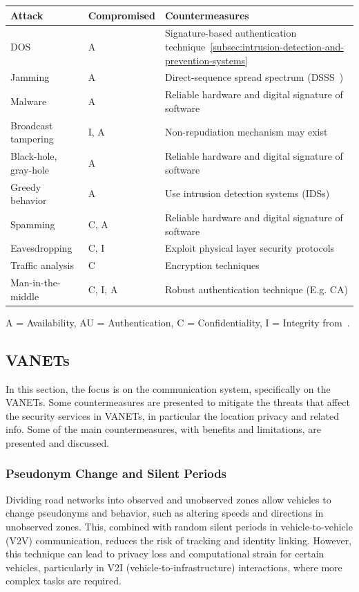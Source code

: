 \begin{table}[h]
    \centering
    \begin{tabular}{|l|l|l|}
        \hline
        \textbf{Attack} & \textbf{Compromised} & \textbf{Countermeasures} \\ \hline
        DOS & A & Signature-based authentication technique~\ref{subsec:intrusion-detection-and-prevention-systems} \\ \hline
        Jamming & A & Direct-sequence spread spectrum (DSSS~\cite{wang2022when}) \\ \hline
        Malware & A & Reliable hardware and digital signature of software \\ \hline
        Broadcast tampering & I, A & Non-repudiation mechanism may exist \\ \hline
        Black-hole, gray-hole & A & Reliable hardware and digital signature of software \\ \hline
        Greedy behavior & A & Use intrusion detection systems (IDSs) \\ \hline
        Spamming & C, A & Reliable hardware and digital signature of software \\ \hline
        Eavesdropping & C, I & Exploit physical layer security protocols \\ \hline
        Traffic analysis & C & Encryption techniques \\ \hline
        Man-in-the-middle & C, I, A & Robust authentication technique (E.g. CA) \\ \hline
    \end{tabular}
    \label{tab:Summary of Attacks and Countermeasures}
\end{table}
A = Availability, AU = Authentication, C = Confidentiality, I = Integrity
from~\cite{sheikh2019comprehensive}.

\subsection{VANETs}\label{subsec:v2x-communication-and-network}

In this section, the focus is on the communication system, specifically on the VANETs.
Some countermeasures are presented to mitigate the threats that affect the security services in VANETs, in particular the location privacy and related info.
Some of the main countermeasures, with benefits and limitations, are presented and discussed.

\subsubsection{Pseudonym Change and Silent Periods}
Dividing road networks into observed and unobserved zones allow vehicles to change pseudonyms and behavior, such as altering speeds and directions in unobserved zones.
This, combined with random silent periods in vehicle-to-vehicle (V2V) communication, reduces the risk of tracking and identity linking.
However, this technique can lead to privacy loss and computational strain for certain vehicles, particularly in V2I (vehicle-to-infrastructure) interactions, where more complex tasks are required.

